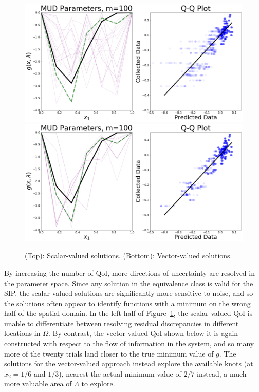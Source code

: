 \begin{figure}[htbp]
\centering
  \includegraphics[width=0.95\linewidth]{figures/pde-highd/pde-highd_pair_D5-1_m100}
  \includegraphics[width=0.95\linewidth]{figures/pde-highd/pde-highd_pair_D5-5_m100}
\caption{
(Top): Scalar-valued solutions.
(Bottom): Vector-valued solutions.
}
\label{fig:pde-highd-5d-mud}
\end{figure}

By increasing the number of QoI, more directions of uncertainty are resolved in the parameter space.
Since any solution in the equivalence class is valid for the SIP, the scalar-valued solutions are significantly more sensitive to noise, and so the solutions often appear to identify functions with a minimum on the wrong half of the spatial domain.
In the left half of Figure~\ref{fig:pde-highd-5d-mud}, the scalar-valued QoI is unable to differentiate between resolving residual discrepancies in different locations in $\Omega$.
By contrast, the vector-valued QoI shown below it is again constructed with respect to the flow of information in the system, and so many more of the twenty trials land closer to the true minimum value of $g$.
The solutions for the vector-valued approach instead explore the available knots (at $x_2=1/6$ and $1/3$), nearest the actual minimum value of $2/7$ instead, a much more valuable area of $\Lambda$ to explore.

